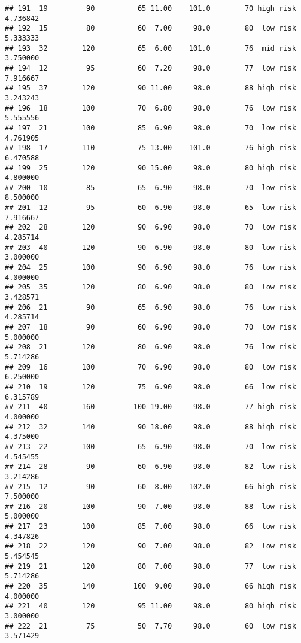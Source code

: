 \documentclass[
  ignorenonframetext,
]{beamer}
\begin{document}
\begin{frame}[fragile]
\begin{verbatim}
## 191  19         90          65 11.00    101.0        70 high risk      4.736842
## 192  15         80          60  7.00     98.0        80  low risk      5.333333
## 193  32        120          65  6.00    101.0        76  mid risk      3.750000
## 194  12         95          60  7.20     98.0        77  low risk      7.916667
## 195  37        120          90 11.00     98.0        88 high risk      3.243243
## 196  18        100          70  6.80     98.0        76  low risk      5.555556
## 197  21        100          85  6.90     98.0        70  low risk      4.761905
## 198  17        110          75 13.00    101.0        76 high risk      6.470588
## 199  25        120          90 15.00     98.0        80 high risk      4.800000
## 200  10         85          65  6.90     98.0        70  low risk      8.500000
## 201  12         95          60  6.90     98.0        65  low risk      7.916667
## 202  28        120          90  6.90     98.0        70  low risk      4.285714
## 203  40        120          90  6.90     98.0        80  low risk      3.000000
## 204  25        100          90  6.90     98.0        76  low risk      4.000000
## 205  35        120          80  6.90     98.0        80  low risk      3.428571
## 206  21         90          65  6.90     98.0        76  low risk      4.285714
## 207  18         90          60  6.90     98.0        70  low risk      5.000000
## 208  21        120          80  6.90     98.0        76  low risk      5.714286
## 209  16        100          70  6.90     98.0        80  low risk      6.250000
## 210  19        120          75  6.90     98.0        66  low risk      6.315789
## 211  40        160         100 19.00     98.0        77 high risk      4.000000
## 212  32        140          90 18.00     98.0        88 high risk      4.375000
## 213  22        100          65  6.90     98.0        70  low risk      4.545455
## 214  28         90          60  6.90     98.0        82  low risk      3.214286
## 215  12         90          60  8.00    102.0        66 high risk      7.500000
## 216  20        100          90  7.00     98.0        88  low risk      5.000000
## 217  23        100          85  7.00     98.0        66  low risk      4.347826
## 218  22        120          90  7.00     98.0        82  low risk      5.454545
## 219  21        120          80  7.00     98.0        77  low risk      5.714286
## 220  35        140         100  9.00     98.0        66 high risk      4.000000
## 221  40        120          95 11.00     98.0        80 high risk      3.000000
## 222  21         75          50  7.70     98.0        60  low risk      3.571429

\end{verbatim}
\end{frame}
\end{document}
